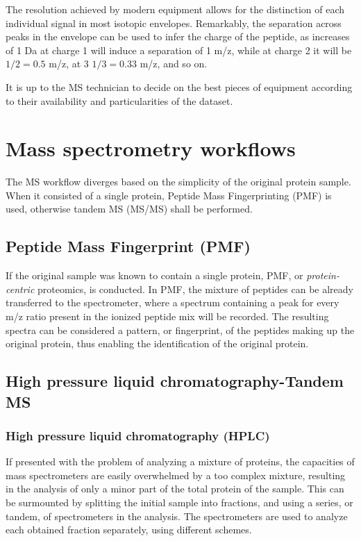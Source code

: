\documentclass[11pt, a4paper]{report}
\begin{document}
The resolution achieved by modern equipment allows for the distinction of each individual signal in most isotopic envelopes. Remarkably, the separation across peaks in the envelope can be used to infer the charge of the peptide, as increases of 1 Da at charge 1 will induce a separation of 1 \ac{m/z}, while at charge 2 it will be $1/2 = 0.5$ \ac{m/z}, at 3 $1/3 = 0.33$ \ac{m/z}, and so on.

It is up to the \ac{MS} technician to decide on the best pieces of equipment according to their availability and particularities of the dataset.

\section{Mass spectrometry workflows}
\label{sec:mass_spectrometry_workflows}

The \ac{MS} workflow diverges based on the simplicity of the original protein sample. When it consisted of a single protein, Peptide Mass Fingerprinting (PMF) is used, otherwise tandem MS (MS/MS) shall be performed. 

\subsection{Peptide Mass Fingerprint (PMF)}
\label{subsec:pmf}

If the original sample was known to contain a single protein, PMF, or \textit{protein-centric} proteomics, is conducted. In PMF, the mixture of peptides can be already transferred to the spectrometer, where a spectrum containing a peak for every m/z ratio present in the ionized peptide mix will be recorded. The resulting spectra can be considered a pattern, or fingerprint, of the peptides making up the original protein, thus enabling the identification of the original protein.


\subsection{High pressure liquid chromatography-Tandem MS}
\label{subsec:ms2}

\subsubsection{High pressure liquid chromatography (HPLC)}

If presented with the problem of analyzing a mixture of proteins, the capacities of mass spectrometers are easily overwhelmed by a too complex mixture, resulting in the analysis of only a minor part of the total protein  of the sample. This can be surmounted by splitting the initial sample into fractions, and using a series, or tandem, of spectrometers in the analysis. The spectrometers are used to analyze each obtained fraction separately, using different schemes.
\end{document}
